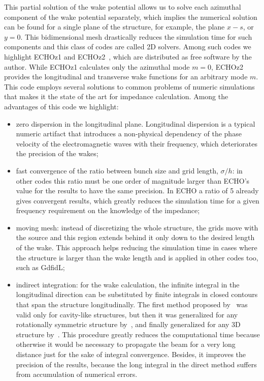     This partial solution of the wake potential allows us to solve each azimuthal component of the wake potential separately, which implies the numerical solution can be found for a single plane of the structure, for example, the plane $x-s$, or $y=0$. This bidimensional mesh drastically reduces the simulation time for such components and this class of codes are called 2D solvers. Among such codes we highlight ECHOz1 and ECHOz2~\cite{Zagorodnov2003, Zagorodnov2005, Zagorodnov2006a}, which are distributed as free software by the author. While ECHOz1 calculates only the azimuthal mode $m=0$, ECHOz2 provides the longitudinal and transverse wake functions for an arbitrary mode $m$.  This code employs several solutions to common problems of numeric simulations that makes it the state of the art for impedance calculation. Among the advantages of this code we highlight:
    \begin{itemize}
	    \item zero dispersion in the longitudinal plane. Longitudinal dispersion is a typical numeric artifact that introduces a non-physical dependency of the phase velocity of the electromagnetic waves with their frequency, which deteriorates the precision of the wakes;
	    \item fast convergence of the ratio between bunch size and grid length, $\sigma/h$: in other codes this ratio must be one order of magnitude larger than ECHO's value for the results to have the same precision. In ECHO a ratio of \SI{5}{} already gives convergent results, which greatly reduces the simulation time for a given frequency requirement on the knowledge of the impedance;
	    \item moving mesh: instead of discretizing the whole structure, the grids move with the source and this region extends behind it only down to the desired length of the wake. This approach helps reducing the simulation time in cases where the structure is larger than the wake length and is applied in other codes too, such as GdfidL;
	    \item indirect integration: for the wake calculation, the infinite integral in the longitudinal direction can be substituted by finite integrals in closed contours that span the structure longitudinally. The first method proposed by~ was valid only for cavity-like structures, but then it was generalized for any rotationally symmetric structure by~, and finally generalized for any 3D structure by~. This procedure greatly reduces the computational time because otherwise it would be necessary to propagate the beam for a very long distance just for the sake of integral convergence. Besides, it improves the precision of the results, because the long integral in the direct method suffers from accumulation of numerical errors.
    \end{itemize}

